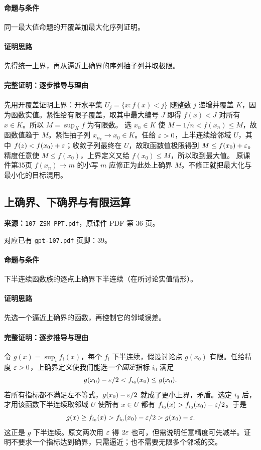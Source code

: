 \paragraph{命题与条件}同一最大值命题的开覆盖加最大化序列证明。
\paragraph{证明思路}先得统一上界，再从逼近上确界的序列抽子列并取极限。
\paragraph{完整证明：逐步推导与理由}

先用开覆盖证明上界：开水平集 $U_j=\{x:f(x)<j\}$ 随整数 $j$ 递增并覆盖 $K$，因为函数实值。紧性给有限子覆盖，取其中最大编号 $J$ 即得 $f(x)<J$ 对所有 $x\in K$。所以 $M=\sup_K f$ 为有限数。
选 $x_n\in K$ 使 $M-1/n<f(x_n)\le M$，故函数值趋于 $M$。紧性抽子列 $x_{n_k}\to x_0\in K$。任给 $\varepsilon>0$，上半连续给邻域 $U$，其中 $f(z)<f(x_0)+\varepsilon$；收敛子列最终在 $U$，故取函数值极限得到 $M\le f(x_0)+\varepsilon$。精度任意使 $M\le f(x_0)$，上界定义又给 $f(x_0)\le M$，所以取到最大值。
原课件第35页 $f(x_n)\to m$ 的小写 $m$ 应修正为此处上确界 $M$。不修正就把最大化与最小化的目标混用。

\clearpage\subsection{上确界、下确界与有限运算}
\textbf{来源：}\texttt{107-ZSM-PPT.pdf}，原课件 PDF 第 36 页。\par
对应已有 \texttt{gpt-107.pdf} 页脚：39。\par
\paragraph{命题与条件}下半连续函数族的逐点上确界下半连续（在所讨论实值情形）。
\paragraph{证明思路}先选一个逼近上确界的函数，再控制它的邻域误差。
\paragraph{完整证明：逐步推导与理由}

令 $g(x)=\sup_i f_i(x)$，每个 $f_i$ 下半连续，假设讨论点 $g(x_0)$ 有限。任给精度 $\varepsilon>0$，上确界定义使我们能选\emph{一个固定}指标 $i_0$ 满足
\[g(x_0)-\varepsilon/2<f_{i_0}(x_0)\le g(x_0).\]
若所有指标都不满足左不等式，$g(x_0)-\varepsilon/2$ 就成了更小上界，矛盾。选定 $i_0$ 后，才用该函数下半连续取邻域 $U$ 使所有 $x\in U$ 都有 $f_{i_0}(x)>f_{i_0}(x_0)-\varepsilon/2$。于是
\[g(x)\ge f_{i_0}(x)>f_{i_0}(x_0)-\varepsilon/2>g(x_0)-\varepsilon.\]
这正是 $g$ 下半连续。原文两次用 $\varepsilon$ 得 $2\varepsilon$ 也可，但需说明任意精度可先减半。证明不要求一个指标达到确界，只需逼近；也不需要无限多个邻域的交。

